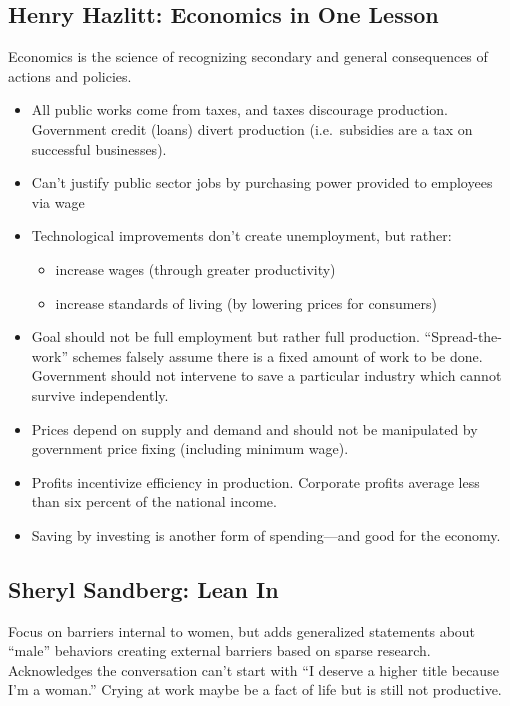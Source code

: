 \documentclass[
]{article}
\begin{document}
\hypertarget{henry-hazlitt-economics-in-one-lesson}{%
\subsection{Henry Hazlitt: Economics in One
Lesson}\label{henry-hazlitt-economics-in-one-lesson}}

Economics is the science of recognizing secondary and general
consequences of actions and policies.

\begin{itemize}
\item
  All public works come from taxes, and taxes discourage production.
  Government credit (loans) divert production (i.e.~subsidies are a tax
  on successful businesses).
\item
  Can't justify public sector jobs by purchasing power provided to
  employees via wage
\item
  Technological improvements don't create unemployment, but rather:

  \begin{itemize}
  \item
    increase wages (through greater productivity)
  \item
    increase standards of living (by lowering prices for consumers)
  \end{itemize}
\item
  Goal should not be full employment but rather full production.
  ``Spread-the-work'' schemes falsely assume there is a fixed amount of
  work to be done. Government should not intervene to save a particular
  industry which cannot survive independently.
\item
  Prices depend on supply and demand and should not be manipulated by
  government price fixing (including minimum wage).
\item
  Profits incentivize efficiency in production. Corporate profits
  average less than six percent of the national income.
\item
  Saving by investing is another form of spending---and good for the
  economy.
\end{itemize}

\hypertarget{sheryl-sandberg-lean-in}{%
\subsection{Sheryl Sandberg: Lean In}\label{sheryl-sandberg-lean-in}}

Focus on barriers internal to women, but adds generalized statements
about ``male'' behaviors creating external barriers based on sparse
research. Acknowledges the conversation can't start with ``I deserve a
higher title because I'm a woman.'' Crying at work maybe be a fact of
life but is still not productive.
\end{document}
